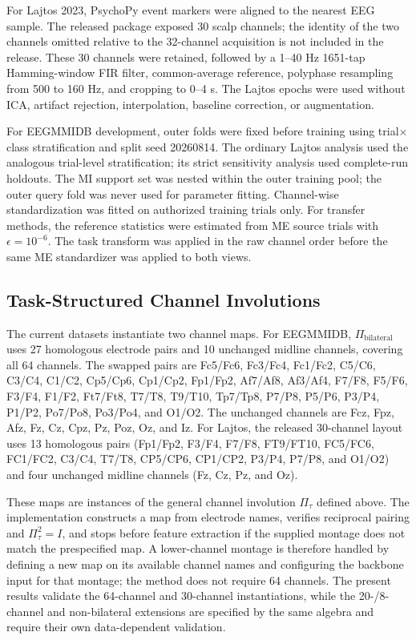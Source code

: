 \documentclass[preprint,12pt]{elsarticle}
\begin{document}
For Lajtos 2023, PsychoPy event markers were aligned to the nearest EEG sample. The released package exposed 30 scalp channels; the identity of the two channels omitted relative to the 32-channel acquisition is not included in the release. These 30 channels were retained, followed by a 1--40 Hz 1651-tap Hamming-window FIR filter, common-average reference, polyphase resampling from 500 to 160 Hz, and cropping to 0--4 s. The Lajtos epochs were used without ICA, artifact rejection, interpolation, baseline correction, or augmentation.

For EEGMMIDB development, outer folds were fixed before training using trial$\times$class stratification and split seed 20260814. The ordinary Lajtos analysis used the analogous trial-level stratification; its strict sensitivity analysis used complete-run holdouts. The MI support set was nested within the outer training pool; the outer query fold was never used for parameter fitting. Channel-wise standardization was fitted on authorized training trials only. For transfer methods, the reference statistics were estimated from ME source trials with $\epsilon=10^{-6}$. The task transform was applied in the raw channel order before the same ME standardizer was applied to both views.

\subsection{Task-Structured Channel Involutions}
The current datasets instantiate two channel maps. For EEGMMIDB, $\Pi_{\mathrm{bilateral}}$ uses 27 homologous electrode pairs and 10 unchanged midline channels, covering all 64 channels. The swapped pairs are Fc5/Fc6, Fc3/Fc4, Fc1/Fc2, C5/C6, C3/C4, C1/C2, Cp5/Cp6, Cp1/Cp2, Fp1/Fp2, Af7/Af8, Af3/Af4, F7/F8, F5/F6, F3/F4, F1/F2, Ft7/Ft8, T7/T8, T9/T10, Tp7/Tp8, P7/P8, P5/P6, P3/P4, P1/P2, Po7/Po8, Po3/Po4, and O1/O2. The unchanged channels are Fcz, Fpz, Afz, Fz, Cz, Cpz, Pz, Poz, Oz, and Iz. For Lajtos, the released 30-channel layout uses 13 homologous pairs (Fp1/Fp2, F3/F4, F7/F8, FT9/FT10, FC5/FC6, FC1/FC2, C3/C4, T7/T8, CP5/CP6, CP1/CP2, P3/P4, P7/P8, and O1/O2) and four unchanged midline channels (Fz, Cz, Pz, and Oz).

These maps are instances of the general channel involution $\Pi_{\tau}$ defined above. The implementation constructs a map from electrode names, verifies reciprocal pairing and $\Pi_{\tau}^{2}=I$, and stops before feature extraction if the supplied montage does not match the prespecified map. A lower-channel montage is therefore handled by defining a new map on its available channel names and configuring the backbone input for that montage; the method does not require 64 channels. The present results validate the 64-channel and 30-channel instantiations, while the 20-/8-channel and non-bilateral extensions are specified by the same algebra and require their own data-dependent validation.
\end{document}
